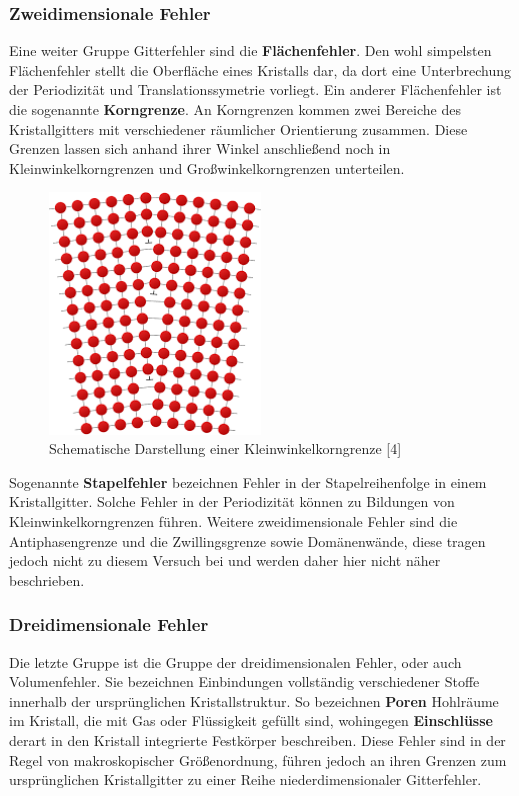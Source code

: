         \subsubsection*{Zweidimensionale Fehler}
            Eine weiter Gruppe Gitterfehler sind die \textbf{Flächenfehler}. Den wohl simpelsten Flächenfehler
            stellt die Oberfläche eines Kristalls dar, da dort eine Unterbrechung der Periodizität und Translationssymetrie vorliegt.
            Ein anderer Flächenfehler ist die sogenannte \textbf{Korngrenze}. An Korngrenzen kommen zwei 
            Bereiche des Kristallgitters mit verschiedener räumlicher Orientierung zusammen. Diese Grenzen lassen sich anhand ihrer Winkel
            anschließend noch in Kleinwinkelkorngrenzen und Großwinkelkorngrenzen unterteilen.
            \begin{figure}[H]
                \centering
                \includegraphics[width=0.5\textwidth]{Images/Kleinwinkelkorngrenze.png}
                \caption{Schematische Darstellung einer Kleinwinkelkorngrenze [4]}
            \end{figure}
            Sogenannte \textbf{Stapelfehler} bezeichnen Fehler in der Stapelreihenfolge in einem Kristallgitter. Solche Fehler in der Periodizität
            können zu Bildungen von Kleinwinkelkorngrenzen führen.
            Weitere zweidimensionale Fehler sind die Antiphasengrenze und die Zwillingsgrenze sowie Domänenwände, diese tragen jedoch nicht
            zu diesem Versuch bei und werden daher hier nicht näher beschrieben.
        \subsubsection*{Dreidimensionale Fehler}
            Die letzte Gruppe ist die Gruppe der dreidimensionalen Fehler, oder auch Volumenfehler. Sie bezeichnen Einbindungen vollständig verschiedener Stoffe innerhalb der ursprünglichen
            Kristallstruktur. So bezeichnen \textbf{Poren} Hohlräume im Kristall, die mit Gas oder Flüssigkeit gefüllt sind, wohingegen
            \textbf{Einschlüsse} derart in den Kristall integrierte Festkörper beschreiben.
            Diese Fehler sind in der Regel von makroskopischer Größenordnung, führen jedoch an ihren Grenzen zum ursprünglichen Kristallgitter
            zu einer Reihe niederdimensionaler Gitterfehler.

